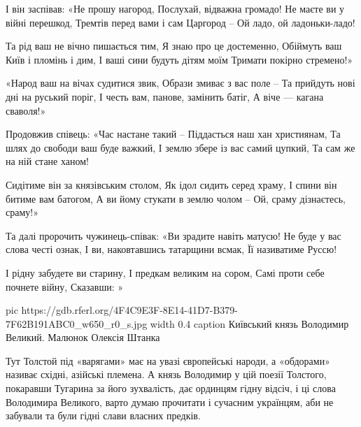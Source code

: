 \begin{multicols}{2}
        \obeycr
І він заспівав: «Не прошу нагород,
Послухай, відважна громадо!
Не маєте ви у війні перешкод,
Тремтів перед вами і сам Царгород –
Ой ладо, ой ладоньки-ладо!

Та рід ваш не вічно пишається тим,
Я знаю про це достеменно,
Обіймуть ваш Київ і пломінь і дим,
І ваші сини будуть дітям моїм
Тримати покірно стремено!»

«Народ ваш на вічах судитися звик,
Образи змиває з вас поле –
Та прийдуть нові дні на руський поріг,
І честь вам, панове, замінить батіг,
А віче --- кагана сваволя!»

Продовжив співець: «Час настане такий –
Піддасться наш хан християнам,
Та шлях до свободи ваш буде важкий,
І землю збере із вас самий цупкий,
Та сам же на ній стане ханом!

Сидітиме він за князівським столом,
Як ідол сидить серед храму,
І спини він битиме вам батогом,
А ви йому стукати в землю чолом –
Ой, сраму дізнаєтесь, сраму!»

Та далі пророчить чужинець-співак:
«Ви зрадите навіть матусю!
Не буде у вас слова честі ознак,
І ви, наковтавшись татарщини всмак,
Її називатиме Руссю!

І рідну забудете ви старину,
І предкам великим на сором,
Самі проти себе почнете війну,
Сказавши: »
        \restorecr
\end{multicols}

\ifcmt
pic https://gdb.rferl.org/4F4C9E3F-8E14-41D7-B379-7F62B191ABC0_w650_r0_s.jpg
width 0.4
caption Київський князь Володимир Великий. Малюнок Олексія Штанка 
\fi

Тут Толстой під «варягами» має на увазі європейські народи, а «обдорами»
називає східні, азійські племена. А князь Володимир у цій поезії Толстого,
покаравши Тугарина за його зухвалість, дає ординцям гідну відсіч, і ці слова
Володимира Великого, варто думаю прочитати і сучасним українцям, аби не
забували та були гідні слави власних предків.

